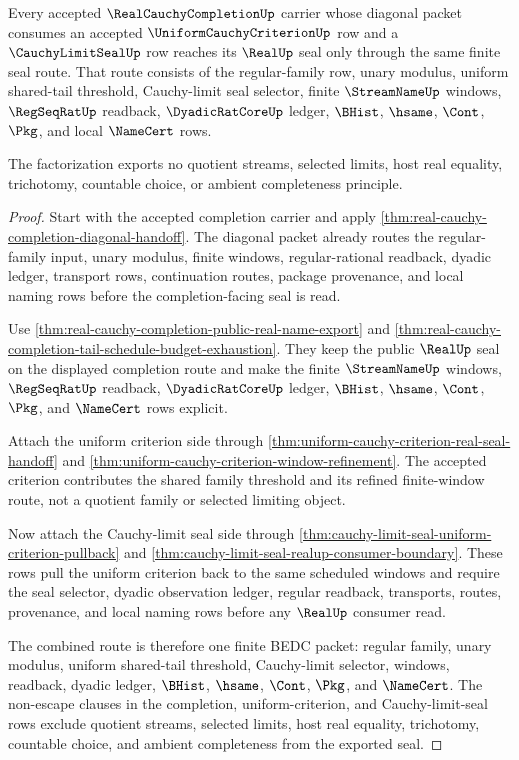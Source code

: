 \begin{theorem}
\label{thm:real-cauchy-completion-uniform-criterion-seal-factorization}
Every accepted $\RealCauchyCompletionUp$ carrier whose diagonal packet consumes an accepted $\UniformCauchyCriterionUp$ row and a $\CauchyLimitSealUp$ row reaches its $\RealUp$ seal only through the same finite seal route. That route consists of the regular-family row, unary modulus, uniform shared-tail threshold, Cauchy-limit seal selector, finite $\StreamNameUp$ windows, $\RegSeqRatUp$ readback, $\DyadicRatCoreUp$ ledger, $\BHist$, $\hsame$, $\Cont$, $\Pkg$, and local $\NameCert$ rows.

The factorization exports no quotient streams, selected limits, host real equality, trichotomy, countable choice, or ambient completeness principle.
\end{theorem}
\begin{proof}
Start with the accepted completion carrier and apply \autoref{thm:real-cauchy-completion-diagonal-handoff}. The diagonal packet already routes the regular-family input, unary modulus, finite windows, regular-rational readback, dyadic ledger, transport rows, continuation routes, package provenance, and local naming rows before the completion-facing seal is read.

Use \autoref{thm:real-cauchy-completion-public-real-name-export} and \autoref{thm:real-cauchy-completion-tail-schedule-budget-exhaustion}. They keep the public $\RealUp$ seal on the displayed completion route and make the finite $\StreamNameUp$ windows, $\RegSeqRatUp$ readback, $\DyadicRatCoreUp$ ledger, $\BHist$, $\hsame$, $\Cont$, $\Pkg$, and $\NameCert$ rows explicit.

Attach the uniform criterion side through \autoref{thm:uniform-cauchy-criterion-real-seal-handoff} and \autoref{thm:uniform-cauchy-criterion-window-refinement}. The accepted criterion contributes the shared family threshold and its refined finite-window route, not a quotient family or selected limiting object.

Now attach the Cauchy-limit seal side through \autoref{thm:cauchy-limit-seal-uniform-criterion-pullback} and \autoref{thm:cauchy-limit-seal-realup-consumer-boundary}. These rows pull the uniform criterion back to the same scheduled windows and require the seal selector, dyadic observation ledger, regular readback, transports, routes, provenance, and local naming rows before any $\RealUp$ consumer read.

The combined route is therefore one finite BEDC packet: regular family, unary modulus, uniform shared-tail threshold, Cauchy-limit selector, windows, readback, dyadic ledger, $\BHist$, $\hsame$, $\Cont$, $\Pkg$, and $\NameCert$. The non-escape clauses in the completion, uniform-criterion, and Cauchy-limit-seal rows exclude quotient streams, selected limits, host real equality, trichotomy, countable choice, and ambient completeness from the exported seal.
\end{proof}


